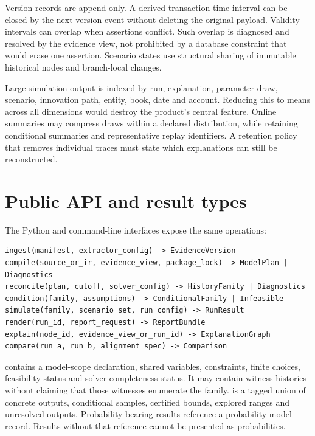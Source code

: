 Version records are append-only. A derived transaction-time interval can be
closed by the next version event without deleting the original payload.
Validity intervals can overlap when assertions conflict. Such overlap is
diagnosed and resolved by the evidence view, not prohibited by a database
constraint that would erase one assertion. Scenario states use structural
sharing of immutable historical nodes and branch-local changes.

Large simulation output is indexed by run, explanation, parameter draw,
scenario, innovation path, entity, book, date and account. Reducing this to
means across all dimensions would destroy the product's central feature.
Online summaries may compress draws within a declared distribution, while
retaining conditional summaries and representative replay identifiers. A
retention policy that removes individual traces must state which explanations
can still be reconstructed.

\begin{minipage}{\linewidth}
\section{Public API and result types}

The Python and command-line interfaces expose the same operations:
\begin{lstlisting}
ingest(manifest, extractor_config) -> EvidenceVersion
compile(source_or_ir, evidence_view, package_lock) -> ModelPlan | Diagnostics
reconcile(plan, cutoff, solver_config) -> HistoryFamily | Diagnostics
condition(family, assumptions) -> ConditionalFamily | Infeasible
simulate(family, scenario_set, run_config) -> RunResult
render(run_id, report_request) -> ReportBundle
explain(node_id, evidence_view_or_run_id) -> ExplanationGraph
compare(run_a, run_b, alignment_spec) -> Comparison
\end{lstlisting}
\end{minipage}

 contains a model-scope declaration, shared variables,
constraints, finite choices, feasibility status and solver-completeness status.
It may contain witness histories without claiming that those witnesses
enumerate the family.  is a tagged union of concrete outputs,
conditional samples, certified bounds, explored ranges and unresolved outputs.
Probability-bearing results reference a probability-model record. Results
without that reference cannot be presented as probabilities.

